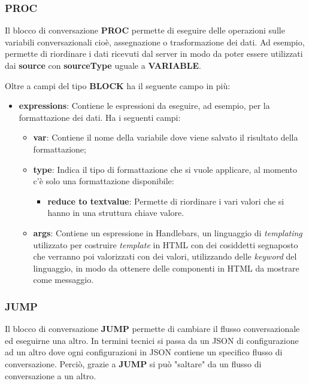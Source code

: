 \subsubsection{PROC}
Il blocco di conversazione \textbf{PROC} permette di eseguire delle operazioni sulle variabili conversazionali cioè, assegnazione o trasformazione dei dati. Ad esempio, permette di riordinare i dati ricevuti dal server in modo da poter essere utilizzati dai \textbf{source} con \textbf{sourceType} uguale a \textbf{VARIABLE}.


Oltre a campi del tipo \textbf{BLOCK} ha il seguente campo in più:

\begin{itemize}
	\item \textbf{expressions}: Contiene le espressioni da eseguire, ad esempio, per la formattazione dei dati.
	Ha i seguenti campi:
	\begin{itemize}
		\item \textbf{var}: Contiene il nome della variabile dove viene salvato il risultato della formattazione;
		\item \textbf{type}: Indica il tipo di formattazione che si vuole applicare, al momento c'è solo una formattazione disponibile:
		\begin{itemize}
			\item \textbf{reduce to textvalue}: Permette di riordinare i vari valori che si hanno in una struttura chiave valore.
		\end{itemize}
		\item \textbf{args}: Contiene un espressione in Handlebars, un linguaggio di \emph{templating} utilizzato per costruire \emph{template} in HTML con dei cosiddetti segnaposto che verranno poi valorizzati con dei valori, utilizzando delle \emph{keyword} del linguaggio, in modo da ottenere delle componenti in HTML da mostrare come messaggio.
	\end{itemize}
\end{itemize}

\subsubsection{JUMP}

Il blocco di conversazione \textbf{JUMP} permette di cambiare il flusso conversazionale ed eseguirne una altro. In termini tecnici si passa da un JSON di configurazione ad un altro dove ogni configurazioni in JSON contiene un specifico flusso di conversazione. Perciò, grazie a \textbf{JUMP} si può "saltare" da un flusso di conversazione a un altro.

